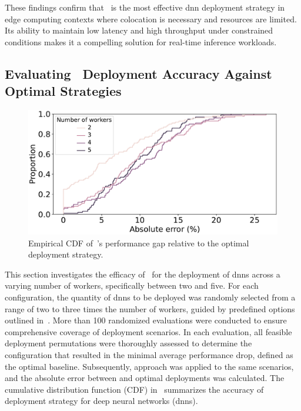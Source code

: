 These findings confirm that~\roomie{} is the most effective \acrshort{dnn} deployment strategy in edge computing contexts where colocation is necessary and resources are limited. Its ability to maintain low latency and high throughput under constrained conditions makes it a compelling solution for real-time inference workloads.


\subsection{Evaluating~\roomie{} Deployment Accuracy Against Optimal Strategies}

\begin{figure}[t!]
	\centering
	\includegraphics[width=\textwidth]{chapters/roomie/images/performance_gap_per_worker.pdf}
	\caption{Empirical CDF of~\roomie's performance gap relative to the optimal deployment strategy.}
	\label{fig:performance_gap}
\end{figure}

This section investigates the efficacy of~\roomie{} for the deployment of \acrshort{dnn}s across a varying number of workers, specifically between two and five. For each configuration, the quantity of \acrshort{dnn}s to be deployed was randomly selected from a range of two to three times the number of workers, guided by predefined options outlined in~. More than 100 randomized evaluations were conducted to ensure comprehensive coverage of deployment scenarios. In each evaluation, all feasible deployment permutations were thoroughly assessed to determine the configuration that resulted in the minimal average performance drop, defined as the optimal baseline. Subsequently, \roomie{} approach was applied to the same scenarios, and the absolute error between \roomie{} and optimal deployments was calculated. The cumulative distribution function (CDF) in~ summarizes the accuracy of~\roomie{} deployment strategy for deep neural networks (\acrshort{dnn}s).

